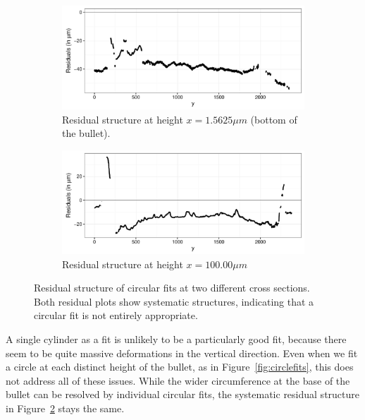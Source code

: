 \documentclass[aoas]{imsart}\usepackage[]{graphicx}\usepackage[]{color}
\newenvironment{knitrout}{}{} %
\begin{document}
\begin{figure}[hbtp]
  \centering
\begin{subfigure}[b]{.49\textwidth}\centering
\caption{\label{fig:residuala}Residual structure at height $x = 1.5625\mu m$ (bottom of the bullet).}
\begin{knitrout}
\color{fgcolor}
\includegraphics[width=\textwidth]{residual2-1} 

\end{knitrout}
\end{subfigure}    
\begin{subfigure}[b]{.49\textwidth}\centering
\caption{\label{fig:residualb} Residual structure at height $x = 100.00\mu m$}
\begin{knitrout}
\color{fgcolor}
\includegraphics[width=\textwidth]{residual-1} 

\end{knitrout}
\end{subfigure}
\caption{\label{fig:residual} Residual structure of circular fits at two different cross sections. Both residual plots show systematic structures, indicating that a circular fit is not entirely appropriate.}
\end{figure}

A single cylinder as a fit is unlikely to be a particularly good fit, because there seem to be quite massive deformations in the vertical direction. Even when we fit a circle at each distinct height of the bullet, as in Figure~\ref{fig:circlefits}, this does not address all of these issues. While the wider circumference at the base of the bullet can be resolved by individual circular fits, the systematic residual structure in Figure~\ref{fig:residualb} stays the same.
\end{document}
